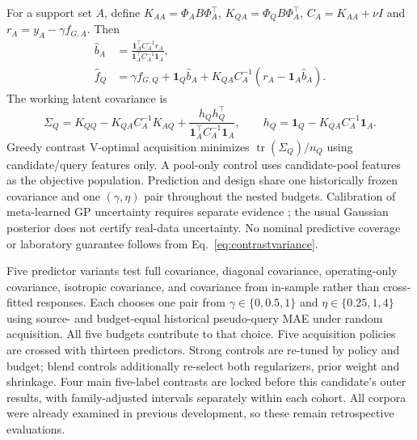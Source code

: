 For a support set $A$, define $K_{AA}=\Phi_A B\Phi_A^\top$, $K_{QA}=\Phi_Q B\Phi_A^\top$, $C_A=K_{AA}+\nu I$ and $r_A=y_A-\gamma f_{G,A}$. Then
\begin{align}
\widehat b_A&=\frac{\mathbf1_A^\top C_A^{-1}r_A}{\mathbf1_A^\top C_A^{-1}\mathbf1_A},\\
\widehat f_Q&=\gamma f_{G,Q}+\mathbf1_Q\widehat b_A+K_{QA}C_A^{-1}(r_A-\mathbf1_A\widehat b_A).
\label{eq:contrastposterior}
\end{align}
The working latent covariance is
\begin{equation}
\Sigma_Q=K_{QQ}-K_{QA}C_A^{-1}K_{AQ}
+\frac{h_Qh_Q^\top}{\mathbf1_A^\top C_A^{-1}\mathbf1_A},\qquad
h_Q=\mathbf1_Q-K_{QA}C_A^{-1}\mathbf1_A.
\label{eq:contrastvariance}
\end{equation}
Greedy contrast V-optimal acquisition minimizes $\operatorname{tr}(\Sigma_Q)/n_Q$ using candidate/query features only. A pool-only control uses candidate-pool features as the objective population. Prediction and design share one historically frozen covariance and one $(\gamma,\eta)$ pair throughout the nested budgets. Calibration of meta-learned GP uncertainty requires separate evidence \cite{iwata}; the usual Gaussian posterior does not certify real-data uncertainty. No nominal predictive coverage or laboratory guarantee follows from Eq.~\ref{eq:contrastvariance}.

Five predictor variants test full covariance, diagonal covariance, operating-only covariance, isotropic covariance, and covariance from in-sample rather than cross-fitted responses. Each chooses one pair from $\gamma\in\{0,0.5,1\}$ and $\eta\in\{0.25,1,4\}$ using source- and budget-equal historical pseudo-query MAE under random acquisition. All five budgets contribute to that choice. Five acquisition policies are crossed with thirteen predictors. Strong controls are re-tuned by policy and budget; blend controls additionally re-select both regularizers, prior weight and shrinkage. Four main five-label contrasts are locked before this candidate's outer results, with family-adjusted intervals separately within each cohort. All corpora were already examined in previous development, so these remain retrospective evaluations.
